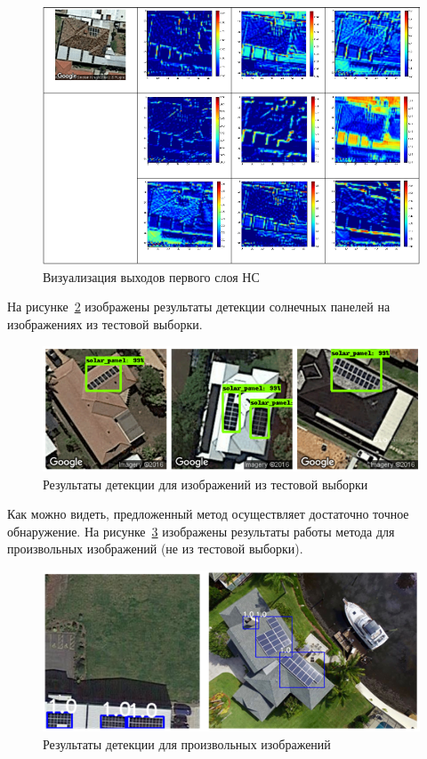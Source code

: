 \begin{figure}[!ht]
	\centering
	\includegraphics[width=16cm]{man-source/images/ch4/pic4-24.png}
	\caption{Визуализация выходов первого слоя НС}
	\label{fig:pic4-24}
\end{figure}

На рисунке~\ref{fig:test_results} изображены результаты детекции солнечных панелей на изображениях из тестовой выборки.

\begin{figure}[!ht]
	\centering
	\includegraphics[width=16cm]{man-source/images/ch4/pic4-22.png}
	\caption{Результаты детекции для изображений из тестовой выборки}
	\label{fig:test_results}
\end{figure}

Как можно видеть, предложенный метод осуществляет достаточно точное обнаружение. На рисунке~\ref{fig:random_results} изображены результаты работы метода для произвольных изображений (не из тестовой выборки).

\begin{figure}[!ht]
	\centering
	\includegraphics[width=16cm]{man-source/images/ch4/pic4-23.png}
	\caption{Результаты детекции для произвольных изображений}
	\label{fig:random_results}
\end{figure}

